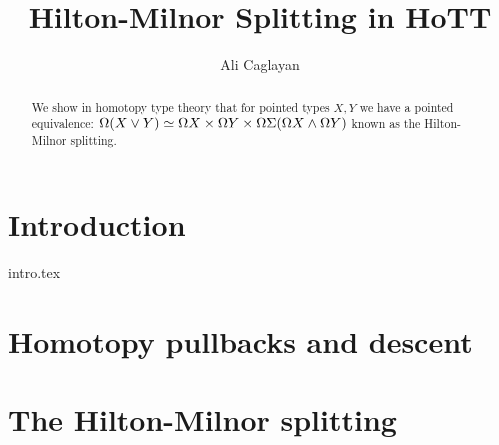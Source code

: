 \documentclass{article}
\title{Hilton-Milnor Splitting in HoTT}
\author{Ali Caglayan}
\begin{document}
    
    \maketitle
    

    \begin{abstract}
        We show in homotopy type theory that for pointed types $X, Y$ we have a pointed equivalence:
        $\Omega (X \vee Y) \simeq \Omega X \times \Omega Y \times \Omega \Sigma (\Omega X \wedge \Omega Y)$
        known as the Hilton-Milnor splitting.
        \begin{comment}
         Observing that this can be iterated we can observe that:
            \begin{equation*}
                \loops \susp (X \vee Y) \simeq \loops \susp X \times \loops \susp Y \times \loops \susp
                    \left(
                        \bigvee_{i, j : \N} X^{\wedge i} \wedge Y^{\wedge j}
                    \right)
            \end{equation*}
        \end{comment}
    \end{abstract}

    \section{Introduction}

     {intro.tex}

    \section{Homotopy pullbacks and descent}
    
    
    
    \section{The Hilton-Milnor splitting}

    
    
    \printbibliography
\end{document}
